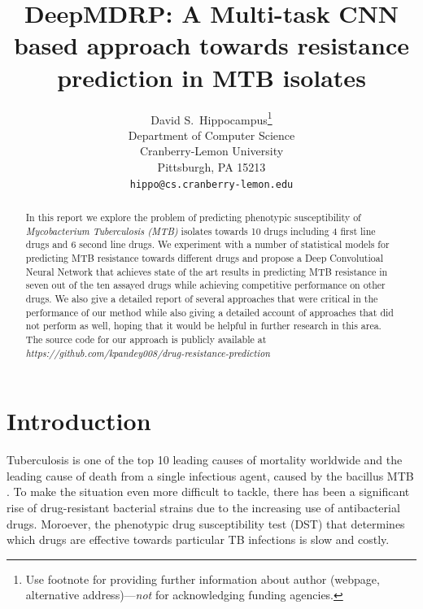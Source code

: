 \documentclass{article}
\title{DeepMDRP: A Multi-task CNN based approach towards resistance prediction in MTB isolates}
\author{%
  David S.~Hippocampus\thanks{Use footnote for providing further information
    about author (webpage, alternative address)---\emph{not} for acknowledging
    funding agencies.} \\
  Department of Computer Science\\
  Cranberry-Lemon University\\
  Pittsburgh, PA 15213 \\
  \texttt{hippo@cs.cranberry-lemon.edu} \\
}
\begin{document}
\maketitle

\begin{abstract}
  In this report we explore the problem of predicting phenotypic susceptibility of \emph{Mycobacterium Tuberculosis (MTB)} isolates
towards 10 drugs including 4 first line drugs and 6 second line drugs. We experiment with a number
of statistical models for predicting MTB resistance towards different drugs and propose a Deep Convolutioal
Neural Network that achieves state of the art results in predicting MTB resistance in seven out of the ten
assayed drugs while achieving competitive performance on other drugs. We also give a detailed report
of several approaches that were critical in the performance of our method while also giving a detailed account
of approaches that did not perform as well, hoping that it would be helpful in further research in
this area. The source
code for our approach is publicly available at \emph{https://github.com/kpandey008/drug-resistance-prediction}
\end{abstract}

\section{Introduction}

Tuberculosis is one of the top 10 leading causes of mortality worldwide and the leading cause
of death from a single infectious agent, caused by the bacillus MTB
\cite{10665-329368}. To make the situation even more difficult to tackle, there has been a significant rise of
drug-resistant bacterial strains due to the increasing use of antibacterial drugs. Moroever, the phenotypic
drug susceptibility test (DST) that determines which drugs are effective towards particular TB infections
is slow and costly.
\end{document}
